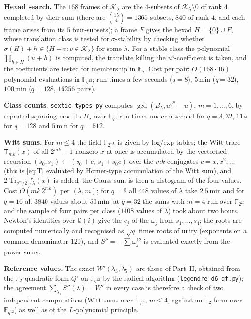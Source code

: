\documentclass[12pt,a4paper]{amsart}
\theoremstyle{definition}
\newcommand{\F}{\mathbb{F}}
\newcommand{\Q}{\mathbb{Q}}
\newcommand{\Tr}{\operatorname{Tr}}
\newcommand{\Kk}{\mathcal{K}}
\newcommand{\Spp}{S''}
\begin{document}
\textbf{Hexad search.} The $168$ frames of $\Kk_\lambda$ are the $4$-subsets of $\Kk_\lambda\setminus0$ of rank $4$ completed by their sum (there are $\binom{15}4=1365$ subsets, $840$ of rank $4$, and each frame arises from its $5$ four-subsets); a frame $F$ gives the hexad $H=\{0\}\cup F$, whose translation class is tested for $\sigma$-stability by checking whether $\sigma(H)+h\in\{H+v:v\in\Kk_\lambda\}$ for some $h$. For a stable class the polynomial $\prod_{h\in H}(u+h)$ is computed, the translate killing the $u^4$-coefficient is taken, and the coefficients are tested for membership in $\F_q$. Cost per pair: $O(168\cdot16)$ polynomial evaluations in $\F_{q^{12}}$; run times a few seconds ($q=8$), $5$\,min ($q=32$), $100$\,min ($q=128$, $16256$ pairs).

\textbf{Class counts.} \texttt{sextic\_types.py} computes $\gcd(B_\lambda,u^{q^m}-u)$, $m=1,\dots,6$, by repeated squaring modulo $B_\lambda$ over $\F_q$; run times under a second for $q=8,32$, $11$\,s for $q=128$ and $5$\,min for $q=512$.

\textbf{Witt sums.} For $m\le4$ the field $\F_{2^{mk}}$ is given by log/exp tables; the Witt trace $\mathsf T_{mk}(x)$ of all $2^{mk}-1$ nonzero $x$ at once is accumulated by the vectorised recursion $(s_0,s_1)\leftarrow(s_0+c,\ s_1+s_0c)$ over the $mk$ conjugates $c=x,x^2,\dots$ (this is \eqref{eq:T} evaluated by Horner-type accumulation of the Witt sum), and $2\Tr_{q^m/2}f_\lambda(x)$ is added; the Gauss sum is then a histogram of the four values. Cost $O(mk\,2^{mk})$ per $(\lambda,m)$; for $q=8$ all $448$ values of $\lambda$ take $2.5$\,min and for $q=16$ all $3840$ values about $50$\,min; at $q=32$ the sums with $m=4$ run over $\F_{2^{20}}$ and the sample of four pairs per class ($1408$ values of $\lambda$) took about two hours. Newton's identities over $\Q(i)$ give the $e_j$ of the $\omega_j$ from $s_1,\dots,s_4$; the roots are computed numerically and recognised as $\sqrt q$ times roots of unity (exponents on a common denominator $120$), and $\Spp=-\sum\omega_j^{12}$ is evaluated exactly from the power sums.

\textbf{Reference values.} The exact $W'(\lambda_3,\lambda_5)$ are those of Part~II, obtained from the $\F_2$-quadratic form $Q'$ on $\F_{q^{12}}$ by the radical algorithm (\texttt{legendre\_d6\_qf.py}); the agreement $\sum_{\lambda_1}\Spp(\lambda)=W'$ in every case is therefore a check of two independent computations (Witt sums over $\F_{q^m}$, $m\le4$, against an $\F_2$-form over $\F_{q^{12}}$) as well as of the $L$-polynomial principle.
\end{document}

